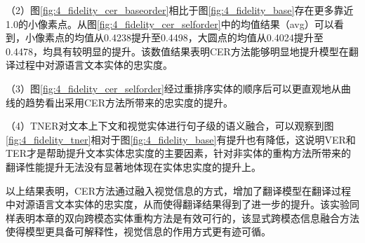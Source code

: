 （2）图\ref{fig:4_fidelity_cer_baseorder}相比于图\ref{fig:4_fidelity_base}存在更多靠近1.0的小像素点。从图\ref{fig:4_fidelity_cer_selforder}中的均值结果（avg）可以看到，小像素点的均值从0.4238提升至0.4498，大圆点的均值从0.4024提升至0.4478，均具有较明显的提升。该数值结果表明CER方法能够明显地提升模型在翻译过程中对源语言文本实体的忠实度。

（3）图\ref{fig:4_fidelity_cer_selforder}经过重排序实体的顺序后可以更直观地从曲线的趋势看出采用CER方法所带来的忠实度的提升。

（4）TNER对文本上下文和视觉实体进行句子级的语义融合，可以观察到图\ref{fig:4_fidelity_tner}相对于图\ref{fig:4_fidelity_base}有提升也有降低，这说明VER和TER才是帮助提升文本实体忠实度的主要因素，针对非实体的重构方法所带来的翻译性能提升无法没有显著地体现在实体忠实度的提升上。

以上结果表明，CER方法通过融入视觉信息的方式，增加了翻译模型在翻译过程中对源语言文本实体的忠实度，从而使得翻译结果得到了进一步的提升。该实验同样表明本章的双向跨模态实体重构方法是有效可行的，该显式跨模态信息融合方法使得模型更具备可解释性，视觉信息的作用方式更有迹可循。
